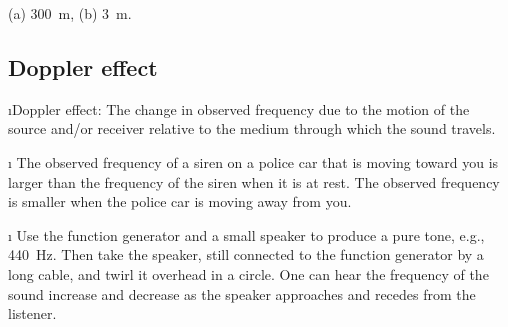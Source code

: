 \ans
(a) 300~m, (b) 3~m.

\ei
\subsection{Doppler effect}
\bi

\i Doppler effect:
The change in observed frequency due to the
motion of the source and/or receiver relative
to the medium through which the sound travels.

\i \ex 
The observed frequency of a siren on a police car 
that is moving toward you is larger than the 
frequency of the siren when it is at rest.
The observed frequency is smaller when the police 
car is moving away from you.

\i \demo
Use the function generator and a small speaker to
produce a pure tone, e.g., 440~Hz.
Then take the speaker, still connected to the
function generator by a long cable, and twirl it
overhead in a circle.
One can hear the frequency of the sound increase 
and decrease as the speaker approaches and recedes 
from the listener.

\ei
